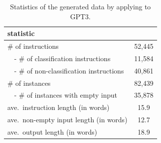 \begin{table}[ht]
    \centering
    \small
    \begin{tabular}{lc}
    \hline
    \toprule
    statistic &  \\ 
    \midrule
    \# of instructions & 52,445 \\
    ~~- \# of classification instructions & 11,584 \\
    ~~- \# of non-classification instructions & 40,861 \\
    \# of instances & 82,439 \\
    ~~- \# of instances with empty input & 35,878 \\
    ave.~instruction length (in words) & 15.9 \\
    ave.~non-empty input length (in words) & 12.7 \\
    ave.~output length (in words) &  18.9 \\
    \bottomrule
    \end{tabular}
    \caption{
        Statistics of the generated data by applying \name{} to GPT3.
    }
    \label{tab:data_statistics}
\end{table}